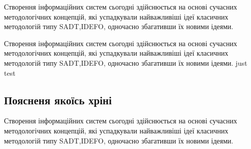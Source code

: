\documentclass{lib/styles/default-style}
\begin{document}
\pagestyle{default-numbered}

\tableofcontents

\newpage


Створення  інформаційних  систем  сьогодні  здійснюється  
на  основі сучасних  методологічних  концепцій,
які  успадкували  найважливіші  ідеї класичних методологій типу
SADT,IDEFO, одночасно збагативши їх новими ідеями.

Створення  інформаційних  систем  сьогодні  здійснюється  
на  основі сучасних  методологічних  концепцій,
які  успадкували  найважливіші  ідеї класичних методологій типу
SADT,IDEFO, одночасно збагативши їх новими ідеями.
just test
\subsection{Поясненя якоїсь хріні}

Створення  інформаційних  систем  сьогодні  здійснюється  
на  основі сучасних  методологічних  концепцій,
які  успадкували  найважливіші  ідеї класичних методологій типу
SADT,IDEFO, одночасно збагативши їх новими ідеями.
\end{document}
